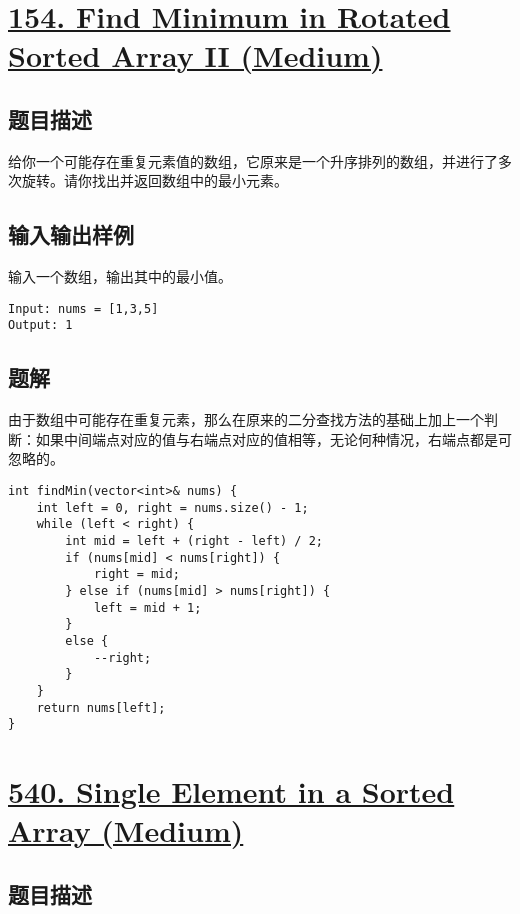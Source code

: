 \documentclass[lang=cn,10pt]{elegantbook}
\begin{document}
{\color{red}\section{\href{https://leetcode.cn/problems/find-minimum-in-rotated-sorted-array-ii/}{154. Find Minimum in Rotated Sorted Array II (Medium)}}} \label{ch4.154}

\subsection*{题目描述}

给你一个可能存在重复元素值的数组，它原来是一个升序排列的数组，并进行了多次旋转。请你找出并返回数组中的最小元素。

\subsection*{输入输出样例}

输入一个数组，输出其中的最小值。

\begin{lstlisting}
Input: nums = [1,3,5]
Output: 1
\end{lstlisting}

\subsection*{题解}

由于数组中可能存在重复元素，那么在原来的二分查找方法的基础上加上一个判断：如果中间端点对应的值与右端点对应的值相等，无论何种情况，右端点都是可忽略的。

\begin{lstlisting}
int findMin(vector<int>& nums) {
	int left = 0, right = nums.size() - 1;
	while (left < right) {
		int mid = left + (right - left) / 2;
		if (nums[mid] < nums[right]) {
			right = mid;
		} else if (nums[mid] > nums[right]) {
			left = mid + 1;
		}
		else {
			--right;
		}
	}
	return nums[left];
}
\end{lstlisting}

{\color{red}\section{\href{https://leetcode.cn/problems/single-element-in-a-sorted-array/}{540. Single Element in a Sorted Array (Medium)}}} \label{ch4.540}

\subsection*{题目描述}
\end{document}
